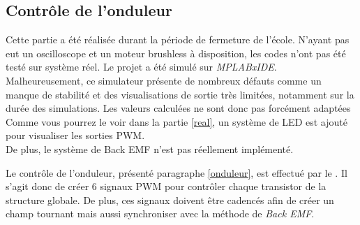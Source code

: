 			\subsection{Contrôle de l'onduleur}			
			\begin{tcolorbox}[center,width=0.9\textwidth, colframe=red!90!orange, colback=orange!25, arc=3mm,boxrule=1mm, sharp corners=east,title=Note]
			Cette partie a été réalisée durant la période de fermeture de l'école. N'ayant pas eut un oscilloscope et un moteur brushless à disposition, les codes n'ont pas été testé sur système réel. Le projet a été simulé sur \textit{MPLABxIDE}. Malheureusement, ce simulateur présente de nombreux défauts comme un manque de stabilité et des visualisations de sortie très limitées, notamment sur la durée des simulations. Les valeurs calculées ne sont donc pas forcément adaptées\\
  			Comme vous pourrez le voir dans la partie \ref{real}, un système de LED est ajouté pour visualiser les sorties PWM. 
  			\\De plus, le système de Back EMF n'est pas réellement implémenté.
  			\end{tcolorbox}
  			Le contrôle de l'onduleur, présenté paragraphe \ref{onduleur}, est effectué par le \dspic . Il s'agit donc de créer 6 signaux  PWM pour contrôler chaque transistor de la structure globale. De plus, ces signaux doivent être cadencés afin de créer un champ tournant mais aussi synchroniser avec la méthode de \textit{Back EMF}.
